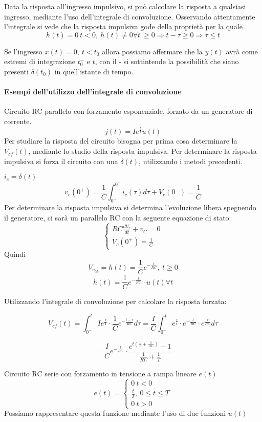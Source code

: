 
Data la risposta all'ingresso impulsivo, si può calcolare la risposta a qualsiasi ingresso, mediante
l'uso dell'integrale di convoluzione.
Osservando attentamente l'integrale si vede che la risposta impulsiva gode della proprietà per la quale
$$
h(t) = 0 \ t<0,\ h(t) \neq 0 \forall t\ \geq 0 \Rightarrow t - \tau \geq 0 \Rightarrow \tau \leq t
$$

Se l'ingresso $x(t) = 0,\ t< t_0$ allora possiamo affermare che la $y(t)$ avrà come estremi di integrazione
$t_0^-$ e $t$, con il - si sottintende la possibilità che siano presenti $\delta(t_0)$ in quell'istante 
di tempo.

\paragraph{Esempi dell'utilizzo dell'integrale di convoluzione}
Circuito RC parallelo con forzamento esponenziale, forzato da un generatore di corrente.
$$
j(t) = I e ^{\frac{t}{\tau}} u(t)
$$
Per studiare la risposta del circuito bisogna per prima cosa determinare la $V_{cf}(t)$, mediante
lo studio della risposta impulsiva.
Per determinare la risposta impulsiva si forza il circuito con una $\delta(t)$, utilizzando i metodi 
precedenti.

$i_c = \delta(t)$
$$
v_c(0^+) = \frac{1}{C}\int_{0^-}^{0^+} i_c(\tau)d\tau + V_c(0^-) = \frac{1}{C}
$$
Per determinare la risposta impulsiva si determina l'evoluzione libera spegnendo il generatore,
ci sarà un parallelo RC con la seguente equazione di stato:
$$
\begin{cases}
RC\frac{dV_c}{dt} + v_C = 0 \\
V_c(0^+) = \frac{1}{C}
\end{cases}
$$
Quindi 
$$
V_{c_{lib}} = h(t) = \frac{1}{C} e^{-\frac{t}{RC}},\ t\geq 0
$$
$$
h(t) = \frac{1}{C}e^{-\frac{t}{RC}}\cdot u(t) \forall t
$$

Utilizzando l'integrale di convoluzione per calcolare la risposta forzata:

$$
V_{cf}(t) = \int_{0^-}^{t}Ie^{\frac{\tau}{T}} \cdot \frac{1}{C} e^{-\frac{t-\tau}{RC}} d\tau = 
\frac{I}{C} \int_{0^-}^{t} e^{\frac{\tau}{t}}\cdot e^{-\frac{t}{RC}}\cdot e^{\frac{\tau}{RC}} d\tau
$$

$$
= \frac{I}{C} e^{-\frac{t}{RC}}\cdot \frac{e^{t\left(\frac{1}{T}+\frac{1}{RC}\right)}-1}{\frac{1}{RC}+\frac{1}{T}}
$$

Circuito RC serie con forzamento in tensione a rampa lineare $e(t)$
$$
e(t) = \begin{cases}
0\ t<0 \\
\frac{t}{T},\ 0\leq t\leq T\\
0\ t>0
\end{cases}
$$
Possiamo rappresentare questa funzione mediante l'uso di due funzioni $u(t)$

